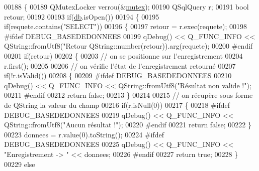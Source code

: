 \begin{DoxyCode}
00188 \{
00189     QMutexLocker verrou(&\hyperlink{class_base_de_donnees_aa1b4696fac87a740f914aa73739086f2}{mutex});
00190     QSqlQuery r;
00191     \textcolor{keywordtype}{bool} retour;
00192 
00193     \textcolor{keywordflow}{if}(\hyperlink{class_base_de_donnees_a3e738dcf443370c46a541677ab619f06}{db}.isOpen())
00194     \{
00195         \textcolor{keywordflow}{if}(requete.contains(\textcolor{stringliteral}{"SELECT"}))
00196         \{
00197             retour = r.exec(requete);
00198 \textcolor{preprocessor}{            #ifdef DEBUG\_BASEDEDONNEES}
00199             qDebug() << Q\_FUNC\_INFO << QString::fromUtf8(\textcolor{stringliteral}{"Retour %
      QString::number(retour)).arg(requete);
00200 \textcolor{preprocessor}{            #endif}
00201             \textcolor{keywordflow}{if}(retour)
00202             \{
00203                 \textcolor{comment}{// on se positionne sur l'enregistrement}
00204                 r.first();
00205 
00206                 \textcolor{comment}{// on vérifie l'état de l'enregistrement retourné}
00207                 \textcolor{keywordflow}{if}(!r.isValid())
00208                 \{
00209 \textcolor{preprocessor}{                    #ifdef DEBUG\_BASEDEDONNEES}
00210                     qDebug() << Q\_FUNC\_INFO << QString::fromUtf8(\textcolor{stringliteral}{"Résultat non valide !"});
00211 \textcolor{preprocessor}{                    #endif}
00212                     \textcolor{keywordflow}{return} \textcolor{keyword}{false};
00213                 \}
00214 
00215                 \textcolor{comment}{// on récupère sous forme de QString la valeur du champ}
00216                 \textcolor{keywordflow}{if}(r.isNull(0))
00217                 \{
00218 \textcolor{preprocessor}{                    #ifdef DEBUG\_BASEDEDONNEES}
00219                     qDebug() << Q\_FUNC\_INFO << QString::fromUtf8(\textcolor{stringliteral}{"Aucun résultat !"});
00220 \textcolor{preprocessor}{                    #endif}
00221                     \textcolor{keywordflow}{return} \textcolor{keyword}{false};
00222                 \}
00223                 donnees = r.value(0).toString();
00224 \textcolor{preprocessor}{                #ifdef DEBUG\_BASEDEDONNEES}
00225                 qDebug() << Q\_FUNC\_INFO << \textcolor{stringliteral}{"Enregistrement -> "} << donnees;
00226 \textcolor{preprocessor}{                #endif}
00227                 \textcolor{keywordflow}{return} \textcolor{keyword}{true};
00228             \}
00229             \textcolor{keywordflow}{else}
}
\end{DoxyCode}
